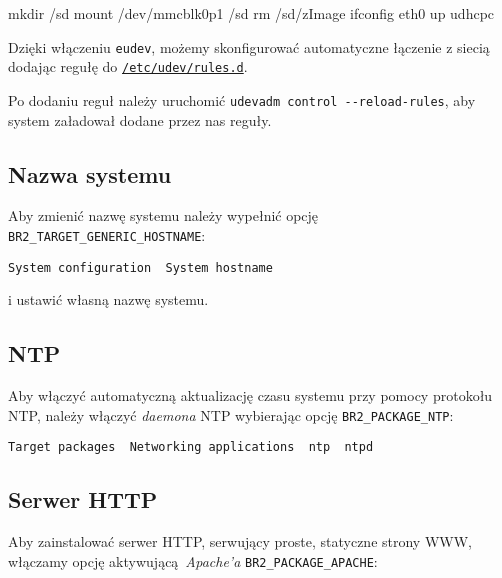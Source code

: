 \documentclass{article}
\newenvironment{textfile}{\ttfamily}{\par}
\begin{document}
\begin{textfile}
mkdir /sd
mount /dev/mmcblk0p1 /sd
rm /sd/zImage
ifconfig eth0 up
udhcpc
\end{textfile}

\noindent Dzięki włączeniu \texttt{eudev}, możemy skonfigurować automatyczne łączenie z siecią dodając regułę do \href{https://github.com/maximeh/buildroot/blob/master/support/scripts/mkusers}{\texttt{/etc/udev/rules.d}}.

Po dodaniu reguł należy uruchomić \texttt{udevadm control -{}-reload-rules}, aby system załadował dodane przez nas reguły.


\subsection{Nazwa systemu}

Aby zmienić nazwę systemu należy wypełnić opcję \texttt{ BR2\_TARGET\_GENERIC\_HOSTNAME}:

\begin{center}
\texttt{System configuration \textrightarrow\ System hostname}
\end{center}

\noindent i ustawić własną nazwę systemu.


\subsection{NTP}

Aby włączyć automatyczną aktualizację czasu systemu przy pomocy protokołu NTP, należy włączyć \emph{daemona} NTP wybierając opcję \texttt{BR2\_PACKAGE\_NTP}:

\begin{center}
\texttt{Target packages \textrightarrow\ Networking applications \textrightarrow\ ntp \textrightarrow\ ntpd}
\end{center}


\subsection{Serwer HTTP}

Aby zainstalować serwer HTTP, serwujący proste, statyczne strony WWW, włączamy opcję aktywującą~\emph{Apache'a} \texttt{BR2\_PACKAGE\_APACHE}:
\end{document}
